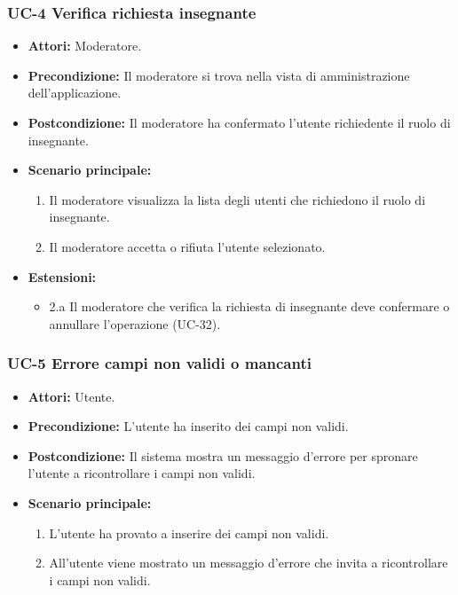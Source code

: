 \subsubsection{UC-4 Verifica richiesta insegnante}
		\begin{itemize}
			\item \textbf{Attori:} Moderatore.
			\item \textbf{Precondizione:} Il moderatore si trova nella vista di amministrazione dell'applicazione.
			\item \textbf{Postcondizione:} Il moderatore ha confermato l'utente richiedente il ruolo di insegnante.
			\item \textbf{Scenario principale:}
				\begin{enumerate}
					\item Il moderatore visualizza la lista degli utenti che richiedono il ruolo di insegnante.
					\item Il moderatore accetta o rifiuta l'utente selezionato.
				\end{enumerate}
			\item \textbf{Estensioni:}
			\begin{itemize}
				\item 2.a Il moderatore che verifica la richiesta di insegnante deve confermare o annullare l'operazione (UC-32).
			\end{itemize}
		\end{itemize}

\subsubsection{UC-5 Errore campi non validi o mancanti}
\begin{itemize}
\item \textbf{Attori:} Utente. 
\item \textbf{Precondizione:} L'utente ha inserito dei campi non validi.
\item \textbf{Postcondizione:} Il sistema mostra un messaggio d'errore per spronare l'utente a ricontrollare i campi non validi.
\item \textbf{Scenario principale:}
		\begin{enumerate}
		\item L'utente ha provato a inserire dei campi non validi.
		\item All'utente viene mostrato un messaggio d'errore che invita a ricontrollare i campi non validi.
		\end{enumerate}
\end{itemize}
